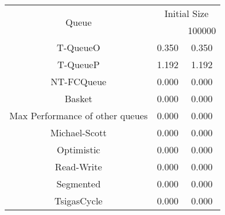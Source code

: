\begin{tabular}{|c|c|c|}
\hline
\multirow{2}{*}{Queue} & \multicolumn{2}{c|}{Initial Size}\\\cline{2-3}& \qquad 10000 \qquad\quad & 100000\\
\hline
\hline
T-QueueO & 0.350 & 0.350\\
T-QueueP & 1.192 & 1.192\\
NT-FCQueue & 0.000 & 0.000\\
Basket & 0.000 & 0.000\\
Max Performance of other queues & 0.000 & 0.000\\
Michael-Scott & 0.000 & 0.000\\
Optimistic & 0.000 & 0.000\\
Read-Write & 0.000 & 0.000\\
Segmented & 0.000 & 0.000\\
TsigasCycle & 0.000 & 0.000\\
\hline\end{tabular}
